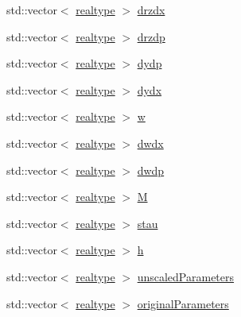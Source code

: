 \begin{DoxyCompactItemize}
\item 
std\+::vector$<$ \mbox{\hyperlink{namespaceamici_a1bdce28051d6a53868f7ccbf5f2c14a3}{realtype}} $>$ \mbox{\hyperlink{classamici_1_1_model_acf722ef69da2112dc1c61d55c4e359ca}{drzdx}}
\item 
std\+::vector$<$ \mbox{\hyperlink{namespaceamici_a1bdce28051d6a53868f7ccbf5f2c14a3}{realtype}} $>$ \mbox{\hyperlink{classamici_1_1_model_af996feb03ef94b432683ea74277cc4a8}{drzdp}}
\item 
std\+::vector$<$ \mbox{\hyperlink{namespaceamici_a1bdce28051d6a53868f7ccbf5f2c14a3}{realtype}} $>$ \mbox{\hyperlink{classamici_1_1_model_a19a0e6ca8882314d7dd4e8f2fcc841fd}{dydp}}
\item 
std\+::vector$<$ \mbox{\hyperlink{namespaceamici_a1bdce28051d6a53868f7ccbf5f2c14a3}{realtype}} $>$ \mbox{\hyperlink{classamici_1_1_model_ace5ccde1d7a065614717cd85fce09f9d}{dydx}}
\item 
std\+::vector$<$ \mbox{\hyperlink{namespaceamici_a1bdce28051d6a53868f7ccbf5f2c14a3}{realtype}} $>$ \mbox{\hyperlink{classamici_1_1_model_a6b305431617db7966c726f756e819843}{w}}
\item 
std\+::vector$<$ \mbox{\hyperlink{namespaceamici_a1bdce28051d6a53868f7ccbf5f2c14a3}{realtype}} $>$ \mbox{\hyperlink{classamici_1_1_model_a58b93c923b4fd9c0322c969954696210}{dwdx}}
\item 
std\+::vector$<$ \mbox{\hyperlink{namespaceamici_a1bdce28051d6a53868f7ccbf5f2c14a3}{realtype}} $>$ \mbox{\hyperlink{classamici_1_1_model_ae0be4b469deded11a9b2569a4da9edea}{dwdp}}
\item 
std\+::vector$<$ \mbox{\hyperlink{namespaceamici_a1bdce28051d6a53868f7ccbf5f2c14a3}{realtype}} $>$ \mbox{\hyperlink{classamici_1_1_model_a0a114d4a6ddc9469fe5e5b4a31317d89}{M}}
\item 
std\+::vector$<$ \mbox{\hyperlink{namespaceamici_a1bdce28051d6a53868f7ccbf5f2c14a3}{realtype}} $>$ \mbox{\hyperlink{classamici_1_1_model_a989f1b7cc176a86d9684f4ccecb16b0d}{stau}}
\item 
std\+::vector$<$ \mbox{\hyperlink{namespaceamici_a1bdce28051d6a53868f7ccbf5f2c14a3}{realtype}} $>$ \mbox{\hyperlink{classamici_1_1_model_a0e4df9c10406b35bd54f6f839322ca87}{h}}
\item 
std\+::vector$<$ \mbox{\hyperlink{namespaceamici_a1bdce28051d6a53868f7ccbf5f2c14a3}{realtype}} $>$ \mbox{\hyperlink{classamici_1_1_model_a2f57f75ff99d8bfcabb33c8cda86308d}{unscaled\+Parameters}}
\item 
std\+::vector$<$ \mbox{\hyperlink{namespaceamici_a1bdce28051d6a53868f7ccbf5f2c14a3}{realtype}} $>$ \mbox{\hyperlink{classamici_1_1_model_a65d6047f145381b0363ac02feb2433b4}{original\+Parameters}}

\end{DoxyCompactItemize}
